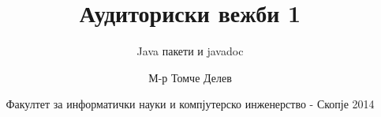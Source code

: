 

\author[АВ1]{М-р Томче Делев}
\title[Напредно програмирање]{Аудиториски вежби 1}
\subtitle{Java пакети и javadoc}
\date{Факултет за информатички науки и компјутерско инженерство - Скопје 2014}





\frame[t,plain]{\titlepage}









